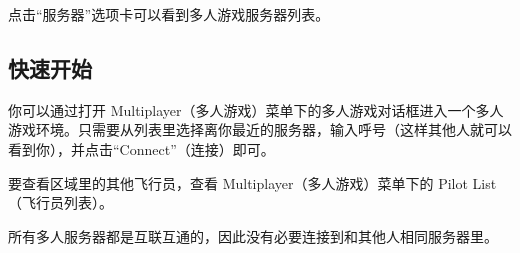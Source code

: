 \noindent
{}

\ifchinese
点击“服务器”选项卡可以看到多人游戏服务器列表。
\fi
\iffalse
\IfLanguageName{english}{
Click on the `server' tab to see a list of multiplayer servers.
}{}
\fi
{}

\ifchinese
\subsection{快速开始}

你可以通过打开 Multiplayer（多人游戏）菜单下的多人游戏对话框进入一个多人游戏环境。只需要从列表里选择离你最近的服务器，输入呼号（这样其他人就可以看到你），并点击“Connect”（连接）即可。

要查看区域里的其他飞行员，查看 Multiplayer（多人游戏）菜单下的 Pilot List（飞行员列表）。

所有多人服务器都是互联互通的，因此没有必要连接到和其他人相同服务器里。
\fi
\iffalse
\IfLanguageName{english}{
\subsection{Quick Start}

You can connect to the MP environment from the MP Settings dialog under the Multiplayer menu. Simply select the
server closest to you from the list, enter a callsign (which will be seen by other players), and click
''Connect''.

To see a list of other pilots are in the area, select Pilot List from the Multiplayer menu.

All the standard MP servers are interconnected, so there is no need to be on the same server as people you are flying with.
}{}
\fi
{}

